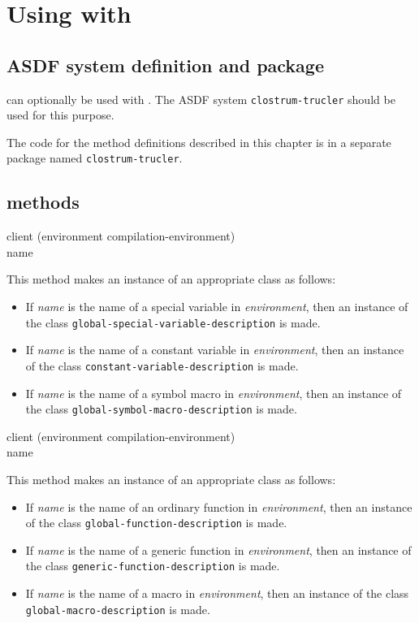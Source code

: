 \chapter{Using \trucler{} with \sysname{}}

\section{ASDF system definition and package}

\trucler{} can optionally be used with \sysname{}.  The ASDF system
\texttt{clostrum-trucler} should be used for this purpose.

The code for the method definitions described in this chapter is in a
separate package named \texttt{clostrum-trucler}.

\section{\trucler{} methods}

 {client (environment
  compilation-environment) \\ name}

This method makes an instance of an appropriate \trucler{} class
as follows:

\begin{itemize}
\item If \textit{name} is the name of a special variable in
  \textit{environment}, then an instance of the \trucler{} class
  \texttt{global-special-variable-description} is made.
\item If \textit{name} is the name of a constant variable in
  \textit{environment}, then an instance of the \trucler{} class
  \texttt{constant-variable-description} is made.
\item If \textit{name} is the name of a symbol macro in
  \textit{environment}, then an instance of the \trucler{} class
  \texttt{global-symbol-macro-description} is made.
\end{itemize}

 {client (environment
  compilation-environment) \\ name}

This method makes an instance of an appropriate \trucler{} class
as follows:

\begin{itemize}
\item If \textit{name} is the name of an ordinary function in
  \textit{environment}, then an instance of the \trucler{} class
  \texttt{global-function-description} is made.
\item If \textit{name} is the name of a generic function in
  \textit{environment}, then an instance of the \trucler{} class
  \texttt{generic-function-description} is made.
\item If \textit{name} is the name of a macro in
  \textit{environment}, then an instance of the \trucler{} class
  \texttt{global-macro-description} is made.
\end{itemize}

